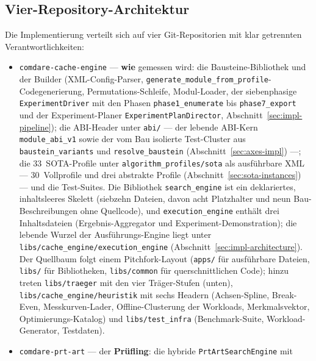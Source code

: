 \begin{nurlang}
\section{Vier-Repository-Architektur}\label{sec:repos}
Die Implementierung verteilt sich auf vier Git-Repositorien mit klar getrennten Verantwortlichkeiten:
\begin{itemize}
  \item \texttt{comdare-cache-engine} --- \textbf{wie} gemessen wird: die Bausteine-Bibliothek und der
  Builder (XML-Config-Parser, \texttt{generate\_\allowbreak{}module\_\allowbreak{}from\_\allowbreak{}profile}-Codegenerierung,
  Permutations-Schleife, Modul-Loader, der siebenphasige \texttt{ExperimentDriver} mit den Phasen
  \texttt{phase1\_enumerate} bis \texttt{phase7\_export} und der Experiment-Planer
  \texttt{ExperimentPlanDirector}, Abschnitt~\ref{sec:impl-pipeline}); die ABI-Header unter \texttt{abi/}
  --- der lebende ABI-Kern \texttt{module\_\allowbreak{}abi\_\allowbreak{}v1} sowie der vom Bau isolierte
  Test-Cluster aus \texttt{baustein\_\allowbreak{}variants} und \texttt{resolve\_\allowbreak{}baustein}
  (Abschnitt~\ref{sec:axes-impl}) ---; die 33~SOTA-Profile unter
  \texttt{algorithm\_\allowbreak{}profiles/\allowbreak{}sota} als ausführbare XML --- 30~Vollprofile und
  drei abstrakte Profile (Abschnitt~\ref{sec:sota-instances}) --- und die Test-Suites. Die Bibliothek \texttt{search\_\allowbreak{}engine} ist ein deklariertes, inhaltsleeres
  Skelett (siebzehn Dateien, davon acht Platzhalter und neun Bau-Beschreibungen ohne Quellcode), und
  \texttt{execution\_\allowbreak{}engine} enthält drei Inhaltsdateien (Ergebnis-Aggregator und
  Experiment-Demonstration); die lebende Wurzel der Ausführungs-Engine liegt unter
  \texttt{libs/\allowbreak{}cache\_\allowbreak{}engine/\allowbreak{}execution\_\allowbreak{}engine}
  (Abschnitt~\ref{sec:impl-architecture}). Der Quellbaum folgt einem Pitchfork-Layout (\texttt{apps/} für
  ausführbare Dateien, \texttt{libs/} für Bibliotheken, \texttt{libs/common} für querschnittlichen Code);
  hinzu treten \texttt{libs/traeger} mit den vier Träger-Stufen (unten),
  \texttt{libs/\allowbreak{}cache\_\allowbreak{}engine/\allowbreak{}heuristik} mit sechs Headern (Achsen-Spline,
  Break-Even, Messkurven-Lader, Offline-Clusterung der Workloads, Merkmalsvektor, Optimierungs-Katalog) und
  \texttt{libs/test\_infra} (Benchmark-Suite, Workload-Generator, Testdaten).
  \item \texttt{comdare-prt-art} --- der \textbf{Prüfling}: die hybride \texttt{PrtArtSearchEngine} mit

\end{itemize}
\end{nurlang}

